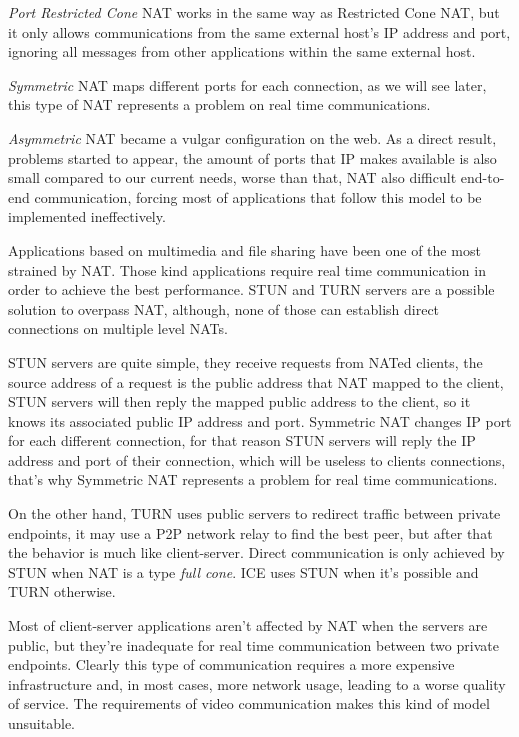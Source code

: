 \textit{Port Restricted Cone} \ac{NAT} works in the same way as Restricted Cone \ac{NAT}, but it only allows communications from the same external host's IP address and port, ignoring all messages from other applications within the same external host.

\textit{Symmetric} NAT maps different ports for each connection, as we will see later, this type of \ac{NAT} represents a problem on real time communications.

\textit{Asymmetric} \ac{NAT} became a vulgar configuration on the web. As a direct result, problems started to appear, the amount of ports that \ac{IP} makes available is also small compared to our current needs, worse than that, \ac{NAT} also difficult end-to-end communication, forcing most of applications that follow this model to be implemented ineffectively.

Applications based on multimedia and file sharing have been one of the most strained by \ac{NAT}. Those kind applications require real time communication in order to achieve the best performance. \ac{STUN} and \ac{TURN} \cite{natvoip} servers are a possible solution to overpass \ac{NAT}, although, none of those can establish direct connections on multiple level \ac{NAT}s.

\ac{STUN} servers are quite simple, they receive requests from \ac{NAT}ed clients, the source address of a request is the public address that \ac{NAT} mapped to the client, \ac{STUN} servers will then reply the mapped public address to the client, so it knows its associated public \ac{IP} address and port. Symmetric \ac{NAT} changes \ac{IP} port for each different connection, for that reason \ac{STUN} servers will reply the \ac{IP} address and port of their connection, which will be useless to clients connections, that's why Symmetric \ac{NAT} represents a problem for real time communications.   

On the other hand, \ac{TURN} uses public servers to redirect traffic between private endpoints, it may use a \ac{P2P} network relay to find the best peer, but after that the behavior is much like client-server. Direct communication is only achieved by \ac{STUN} when \ac{NAT} is a type \textit{full cone}. \ac{ICE} uses \ac{STUN} when it's possible and \ac{TURN} otherwise.

Most of client-server applications aren't affected by \ac{NAT} when the servers are public, but they're inadequate for real time communication between two private endpoints. Clearly this type of communication requires a more expensive infrastructure and, in most cases, more network usage, leading to a worse quality of service. The requirements of video communication makes this kind of model unsuitable.

